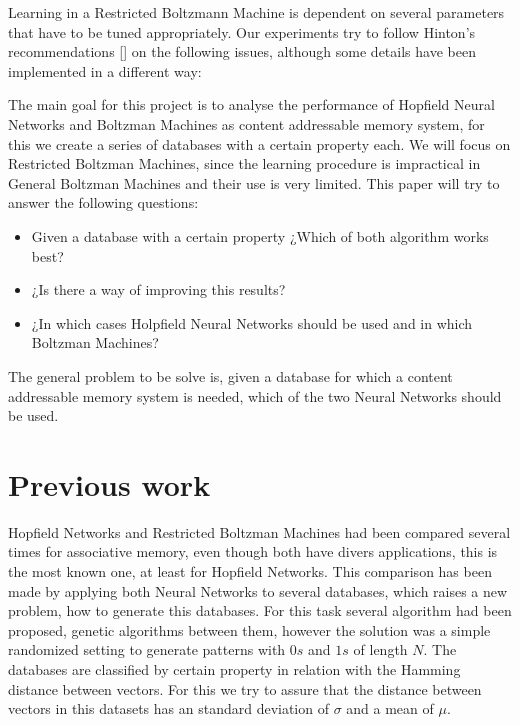 \documentclass[anon]{CI}
\begin{document}
Learning in a Restricted Boltzmann Machine is dependent on several parameters that have to be tuned appropriately. Our experiments try to follow Hinton’s recommendations [\cite{hinton2012}] on the following issues, although some details have been implemented in a different way:






The main goal for this project is to analyse the performance of Hopfield Neural Networks and Boltzman Machines as content addressable memory system, for this we create a series of databases with a certain property each. We will focus on Restricted Boltzman Machines, since the learning procedure is impractical in General Boltzman Machines and their use is very limited. This paper will try to answer the following questions:

\begin{itemize}
	\item Given a database with a certain property ¿Which of both algorithm works best?
	\item ¿Is there a way of improving this results?
	\item ¿In which cases Holpfield Neural Networks should be used and in which Boltzman Machines?
\end{itemize}

The general problem to be solve is, given a database for which a content addressable memory system is needed, which of the two Neural Networks should be used.




\section{Previous work}

Hopfield Networks and Restricted Boltzman Machines had been compared several times for associative memory, even though both have divers applications, this is the most known one, at least for Hopfield Networks. This comparison has been made by applying both Neural Networks to several databases, which raises a new problem, how to generate this databases. For this task several algorithm had been proposed, genetic algorithms between them, however the solution was a simple randomized setting to generate patterns with $ 0s $ and $ 1s $ of length $N$. The databases are classified by certain property in relation with the Hamming distance between vectors. For this we try to assure that the distance between vectors in this datasets has an standard deviation of $\sigma$ and a mean of $\mu$. 
\end{document}
